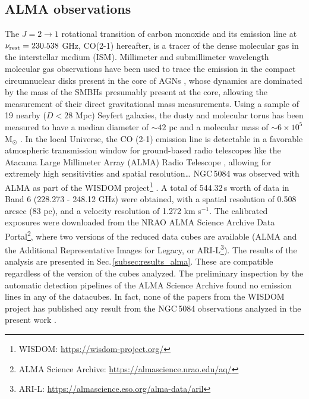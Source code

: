\documentclass[modern]{CORE-AAS/aastex631}
\begin{document}
\subsection{ALMA observations} \label{subsec:data_ALMA}
The $J = 2 \rightarrow 1$ rotational transition of carbon monoxide and its emission line at $\nu_{\rm rest} = 230.538$ GHz, CO(2-1) hereafter, is a tracer of the dense molecular gas in the interstellar medium (ISM). Millimeter and submillimeter wavelength molecular gas observations have been used to trace the emission in the compact circumnuclear disks present in the core of AGNs \citep{garciaburillo+2021aap652_98}, whose dynamics are dominated by the mass of the SMBHs presumably present at the core, allowing the measurement of their direct gravitational mass \citep{davis+2013nat494_328,onishi+2015apj806_39} measurements. Using a sample of 19 nearby ($D<28$ Mpc) Seyfert galaxies, the dusty and molecular torus has been measured to have a median diameter of $\sim42$ pc and a molecular mass of $\sim6\times10^{5}$ M$_{\odot}$ \citep{garciaburillo+2021aap652_98}. In the local Universe, the CO (2-1) emission line is detectable in a favorable atmospheric transmission window for ground-based radio telescopes like the Atacama Large Millimeter Array (ALMA) Radio Telescope \citep{leroy+2021apj257_43}, allowing for extremely high sensitivities and spatial resolution…
NGC\,5084 was observed with ALMA as part of the WISDOM project\footnote{WISDOM: \url{https://wisdom-project.org/}} \citep[Project code: 2015.1.00598.S, PI: Martin Bureau,][]{onishi+2017mnras468_4663}. A total of 544.32\,s worth of data in Band 6 (228.273 - 248.12 GHz) were obtained, with a spatial resolution of 0.508 arcsec (83 pc), and a velocity resolution of 1.272 km s$^{-1}$. The calibrated exposures were downloaded from the NRAO ALMA Science Archive Data Portal\footnote{ALMA Science Archive: \url{https://almascience.nrao.edu/aq/}}, where two versions of the reduced data cubes are available (ALMA and the Additional Representative Images for Legacy, or ARI-L\footnote{ARI-L: \url{https://almascience.eso.org/alma-data/aril}}).
The results of the analysis are presented in Sec.\,\ref{subsec:results_alma}. These are compatible regardless of the version of the cubes analyzed. The preliminary inspection by the automatic detection pipelines of the ALMA Science Archive found no emission lines in any of the datacubes. In fact, none of the papers from the WISDOM project has published any result from the NGC\,5084 observations analyzed in the present work \citep{smith+2021mnras500_1933, davis+2022mnras512_1522}. 
\end{document}
